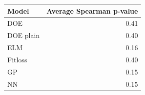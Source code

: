 \begin{tabular}{lr}
\toprule
Model & Average Spearman p-value \\
\midrule
DOE & 0.41 \\
DOE plain & 0.40 \\
ELM & 0.16 \\
Fitloss & 0.40 \\
GP & 0.15 \\
NN & 0.15 \\
\bottomrule
\end{tabular}
